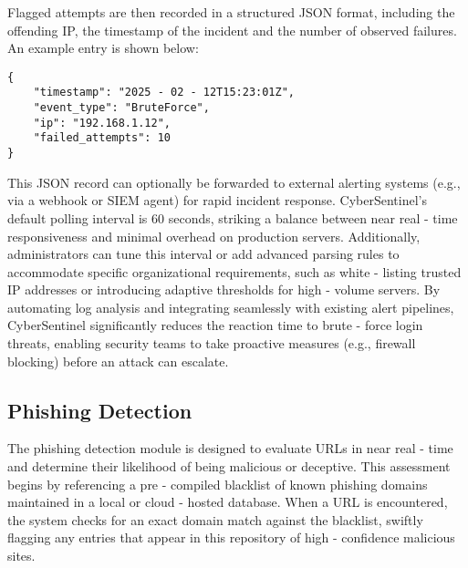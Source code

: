 \documentclass{article}
\begin{document}
Flagged attempts are then recorded in a structured JSON format, including the offending IP, the timestamp of the incident and the number of observed failures. An example entry is shown below:

\begin{lstlisting}
{
    "timestamp": "2025 - 02 - 12T15:23:01Z",
    "event_type": "BruteForce",
    "ip": "192.168.1.12",
    "failed_attempts": 10
}
\end{lstlisting}

This JSON record can optionally be forwarded to external alerting systems (e.g., via a webhook or SIEM agent) for rapid incident response. CyberSentinel’s default polling interval is 60 seconds, striking a balance between near real - time responsiveness and minimal overhead on production servers. Additionally, administrators can tune this interval or add advanced parsing rules to accommodate specific organizational requirements, such as white - listing trusted IP addresses or introducing adaptive thresholds for high - volume servers. By automating log analysis and integrating seamlessly with existing alert pipelines, CyberSentinel significantly reduces the reaction time to brute - force login threats, enabling security teams to take proactive measures (e.g., firewall blocking) before an attack can escalate.

\subsection{Phishing Detection}
The phishing detection module is designed to evaluate URLs in near real - time and determine their likelihood of being malicious or deceptive. This assessment begins by referencing a pre - compiled blacklist of known phishing domains maintained in a local or cloud - hosted database. When a URL is encountered, the system checks for an exact domain match against the blacklist, swiftly flagging any entries that appear in this repository of high - confidence malicious sites.
\end{document}
